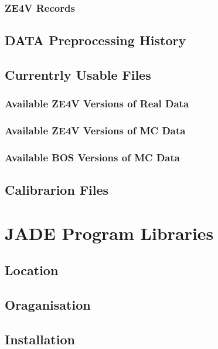 \subsubsection{ZE4V Records}

\subsection{DATA Preprocessing History}


\subsection{Currentrly Usable Files}



\subsubsection{Available ZE4V Versions of Real Data}


\subsubsection{Available ZE4V Versions of MC Data}


\subsubsection{Available BOS Versions of MC Data}


\subsection{Calibrarion Files}



\section{JADE Program Libraries}


\subsection{Location}


\subsection{Oraganisation}


\subsection{Installation}



